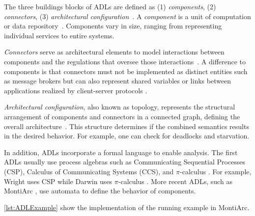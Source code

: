 \documentclass[runningheads]{llncs}
\begin{document}
The three buildings blocks of ADLs are defined as (1) \textit{components}, (2) \textit{connectors}, (3) \textit{architectural configuration}~\cite{medvidovicClassificationComparisonFramework2000,medvidovicFrameworkClassifyingComparing1997}.
A \textit{component} is a unit of computation or data repository~\cite{medvidovicClassificationComparisonFramework2000}.
Components vary in size, ranging from representing individual services to entire systems.

\textit{Connectors} serve as architectural elements to model interactions between components and the regulations that oversee those interactions~\cite{medvidovicClassificationComparisonFramework2000}.
A difference to components is that connectors must not be implemented as distinct entities such as message brokers but can also represent shared variables or links between applications realized by client-server protocols \cite{medvidovicClassificationComparisonFramework2000}.

\textit{Architectural configuration}, also known as topology, represents the structural arrangement of components and connectors in a connected graph, defining the overall architecture~\cite{medvidovicClassificationComparisonFramework2000}.
This structure determines if the combined semantics results in the desired behavior.
For example, one can check for deadlocks and starvation.

In addition, ADLs incorporate a formal language to enable analysis.
The first ADLs usually use process algebras such as Communicating Sequential Processes (CSP), Calculus of Communicating Systems (CCS), and $\pi$-calculus \cite{ozkayaAreWeThere2013}.
For example, Wright uses CSP \cite{allenFormalBasisArchitectural1997} while Darwin uses $\pi$-calculus \cite{mageeSpecifyingDistributedSoftware1995}.
More recent ADLs, such as MontiArc \cite{haberMontiArcArchitecturalModeling2014}, use automata to define the behavior of components.

\autoref{lst:ADLExample} show the implementation of the running example in MontiArc.


\end{document}
